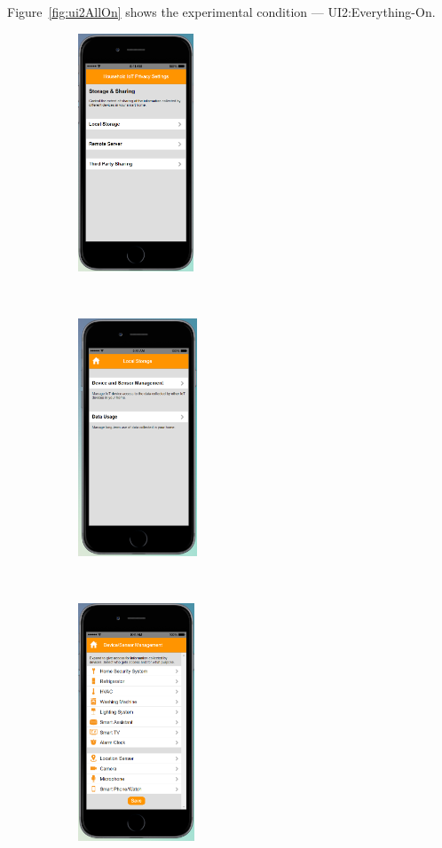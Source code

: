 \begin{appendices}
Figure~\ref{fig:ui2AllOn} shows the experimental condition --- UI2:Everything-On.
\begin{figure}
	\centering
	\begin{subfigure}[t]{0.19\textwidth}
		\centering
		\includegraphics[height=2.8in]{figures/ui2allOff1.png}
	\end{subfigure}%
	~~~~~~
	\begin{subfigure}[t]{0.19\textwidth}
		\centering
		\includegraphics[height=2.8in]{figures/ui2allOffLocal.png}
	\end{subfigure}%
	~~~~~~
	\begin{subfigure}[t]{0.19\textwidth}
		\centering
		\includegraphics[height=2.8in]{figures/ui2allOff2.png}

\end{subfigure}
\end{figure}
\end{appendices}
